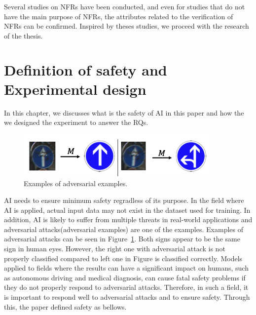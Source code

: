 \documentclass[journal,article,submit,moreauthors,pdftex]{Definitions/mdpi}
\begin{document}
Several studies on NFRs have been conducted, and even for studies that do not have the main purpose of NFRs, the attributes related to the verification of NFRs can be confirmed.
Inspired by theses studies, we proceed with the research of the thesis.

\section{Definition of safety and Experimental design} %




In this chapter, we discusses what is the safety of AI in this paper and how the we designed the experiment to answer the RQs.

\begin{figure}[H]
\includegraphics[width=13 cm]{Definitions/example-of-adversarial.png}
\caption{Examples of adversarial examples.\label{example-of-adversarial}}
\end{figure}   

AI needs to ensure minimum safety regradless of its purpose. In the field where AI is applied, actual input data may not exist in the dataset used for training.
In addition, AI is likely to suffer from multiple threats in real-world applications and adversarial attacks(adversarial examples) are one of the examples.
Examples of adversarial attacks can be seen in Figure~\ref{example-of-adversarial}. Both signs appear to be the same sign in human eyes. However, the right one with adversarial attack is not properly classified compared to left one in Figure is classified correctly.
Models applied to fields where the results can have a significant impact on humans, such as autonomous driving and medical diagnosis, can cause fatal safety problems if they do not properly respond to adversarial attacks. Therefore, in such a field, it is important to respond well to adversarial attacks and to ensure safety.
Through this, the paper defined safety as bellows.
\end{document}
